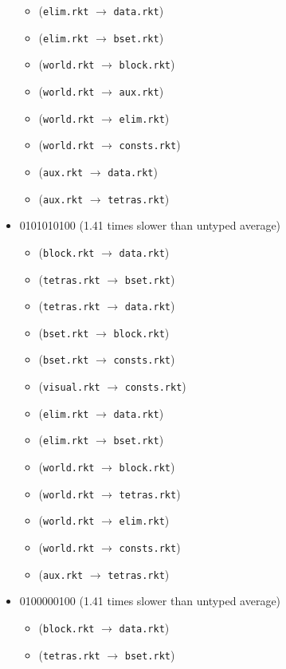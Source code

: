 \documentclass{article}
\newcommand{\mono}[1]{\texttt{#1}}
\begin{document}
\begin{itemize}
\begin{itemize}
  \item (\mono{elim.rkt} $\rightarrow$ \mono{data.rkt})
  \item (\mono{elim.rkt} $\rightarrow$ \mono{bset.rkt})
  \item (\mono{world.rkt} $\rightarrow$ \mono{block.rkt})
  \item (\mono{world.rkt} $\rightarrow$ \mono{aux.rkt})
  \item (\mono{world.rkt} $\rightarrow$ \mono{elim.rkt})
  \item (\mono{world.rkt} $\rightarrow$ \mono{consts.rkt})
  \item (\mono{aux.rkt} $\rightarrow$ \mono{data.rkt})
  \item (\mono{aux.rkt} $\rightarrow$ \mono{tetras.rkt})
  \end{itemize}
\item 0101010100 (1.41 times slower than untyped average)
  \begin{itemize}
  \item (\mono{block.rkt} $\rightarrow$ \mono{data.rkt})
  \item (\mono{tetras.rkt} $\rightarrow$ \mono{bset.rkt})
  \item (\mono{tetras.rkt} $\rightarrow$ \mono{data.rkt})
  \item (\mono{bset.rkt} $\rightarrow$ \mono{block.rkt})
  \item (\mono{bset.rkt} $\rightarrow$ \mono{consts.rkt})
  \item (\mono{visual.rkt} $\rightarrow$ \mono{consts.rkt})
  \item (\mono{elim.rkt} $\rightarrow$ \mono{data.rkt})
  \item (\mono{elim.rkt} $\rightarrow$ \mono{bset.rkt})
  \item (\mono{world.rkt} $\rightarrow$ \mono{block.rkt})
  \item (\mono{world.rkt} $\rightarrow$ \mono{tetras.rkt})
  \item (\mono{world.rkt} $\rightarrow$ \mono{elim.rkt})
  \item (\mono{world.rkt} $\rightarrow$ \mono{consts.rkt})
  \item (\mono{aux.rkt} $\rightarrow$ \mono{tetras.rkt})
  \end{itemize}
\item 0100000100 (1.41 times slower than untyped average)
  \begin{itemize}
  \item (\mono{block.rkt} $\rightarrow$ \mono{data.rkt})
  \item (\mono{tetras.rkt} $\rightarrow$ \mono{bset.rkt})

\end{itemize}
\end{itemize}
\end{document}
